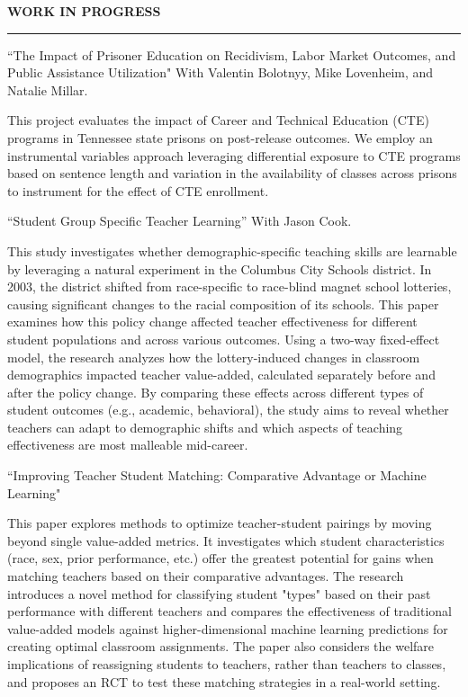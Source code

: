 \documentclass[11pt]{article}
\newenvironment{rSection}[1]{
  \vspace{1.5em}
  \noindent\textbf{\MakeUppercase{#1}}
  \vspace{0.2em}\hrule\vspace{0.5em}
}{}
\renewenvironment{quote}{%
  \list{}{\rightmargin=0pt \leftmargin=1.5em}%
  \item\relax
}
{\endlist}
\begin{document}
\begin{rSection}{Work in Progress}
    ``The Impact of Prisoner Education on Recidivism, Labor Market Outcomes, and Public Assistance Utilization" With Valentin Bolotnyy, Mike Lovenheim, and Natalie Millar.
    \begin{quote}
        \small{This project evaluates the impact of Career and Technical Education (CTE) programs in Tennessee state prisons on post-release outcomes. We employ an instrumental variables approach leveraging differential exposure to CTE programs based on sentence length and variation in the availability of classes across prisons to instrument for the effect of CTE enrollment.}
    \end{quote}

    ``Student Group Specific Teacher Learning'' With Jason Cook.
    \begin{quote}
        \small{This study investigates whether demographic-specific teaching skills are learnable by leveraging a natural experiment in the Columbus City Schools district. In 2003, the district shifted from race-specific to race-blind magnet school lotteries, causing significant changes to the racial composition of its schools. This paper examines how this policy change affected teacher effectiveness for different student populations and across various outcomes. Using a two-way fixed-effect model, the research analyzes how the lottery-induced changes in classroom demographics impacted teacher value-added, calculated separately before and after the policy change. By comparing these effects across different types of student outcomes (e.g., academic, behavioral), the study aims to reveal whether teachers can adapt to demographic shifts and which aspects of teaching effectiveness are most malleable mid-career.}
    \end{quote}

    ``Improving Teacher Student Matching: Comparative Advantage or Machine Learning"
    \begin{quote}
        \small{This paper explores methods to optimize teacher-student pairings by moving beyond single value-added metrics. It investigates which student characteristics (race, sex, prior performance, etc.) offer the greatest potential for gains when matching teachers based on their comparative advantages. The research introduces a novel method for classifying student "types" based on their past performance with different teachers and compares the effectiveness of traditional value-added models against higher-dimensional machine learning predictions for creating optimal classroom assignments. The paper also considers the welfare implications of reassigning students to teachers, rather than teachers to classes, and proposes an RCT to test these matching strategies in a real-world setting.}
    \end{quote}
\end{rSection}
\end{document}
